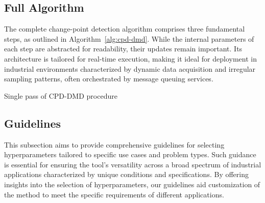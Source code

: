 \subsection{Full Algorithm}
The complete change-point detection algorithm comprises three fundamental steps, as outlined in Algorithm~\ref{alg:cpd-dmd}. While the internal parameters of each step are abstracted for readability, their updates remain important. Its architecture is tailored for real-time execution, making it ideal for deployment in industrial environments characterized by dynamic data acquisition and irregular sampling patterns, often orchestrated by message queuing services.

\begin{algorithm}
    \caption{Single pass of CPD-DMD procedure}\label{alg:cpd-dmd}
    \begin{algorithmic}[1]

    \end{algorithmic}
\end{algorithm}

\subsection{Guidelines}\label{sec:guidelines}
This subsection aims to provide comprehensive guidelines for selecting hyperparameters tailored to specific use cases and problem types. Such guidance is essential for ensuring the tool's versatility across a broad spectrum of industrial applications characterized by unique conditions and specifications. By offering insights into the selection of hyperparameters, our guidelines aid customization of the method to meet the specific requirements of different applications.

